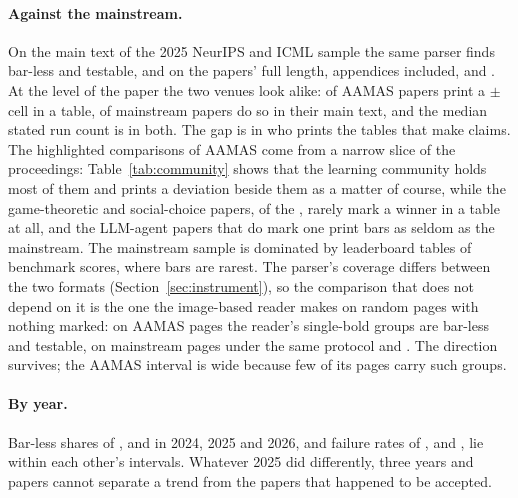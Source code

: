 \documentclass[sigconf,anonymous]{aamas}
\begin{document}
\paragraph{Against the mainstream.} On the main text of the 2025 NeurIPS and
ICML sample the same parser finds \nMlMainNeither{} bar-less and
\nMlMainTestable{} testable, and on the papers' full length, appendices
included, \nMlPctNeither{} and \nMlPctTestable{}. At the level of the paper
the two venues look alike: \nAPctPapersErr{} of AAMAS papers print a $\pm$
cell in a table, \nMlMainPapersErr{} of mainstream papers do so in their
main text, and the median stated run count is \nAMedianRuns{} in both. The
gap is in who prints the tables that make claims. The highlighted
comparisons of AAMAS come from a narrow slice of the proceedings:
Table~\ref{tab:community} shows that the learning community holds most of
them and prints a deviation beside them as a matter of course, while the
game-theoretic and social-choice papers, \nCGameTheorySocialChoicePapers{}
of the \nAPapers{}, rarely mark a winner in a table at all, and the
LLM-agent papers that do mark one print bars as seldom as the mainstream.
The mainstream sample is dominated by leaderboard tables of benchmark
scores, where bars are rarest. The parser's coverage differs between the
two formats (Section~\ref{sec:instrument}), so the comparison that does not
depend on it is the one the image-based reader makes on random pages with
nothing marked: on \nPagesRead{} AAMAS pages the reader's single-bold
groups are \nPagesReaderNeither{} bar-less and \nPagesReaderTestable{}
testable, on \nScPages{} mainstream pages under the same protocol
\nScReaderNeither{} and \nScReaderTestable{}. The direction survives; the
AAMAS interval is wide because few of its pages carry such groups.

\paragraph{By year.} Bar-less shares of \nANeitherTwentyFourCi{},
\nANeitherTwentyFiveCi{} and \nANeitherTwentySixCi{} in 2024, 2025 and 2026,
and failure rates of \nAFailTwentyFourCi{}, \nAFailTwentyFiveCi{} and
\nAFailTwentySixCi{}, lie within each other's intervals. Whatever 2025 did
differently, three years and \nAPapersTestable{} papers cannot separate a
trend from the papers that happened to be accepted.
\end{document}
